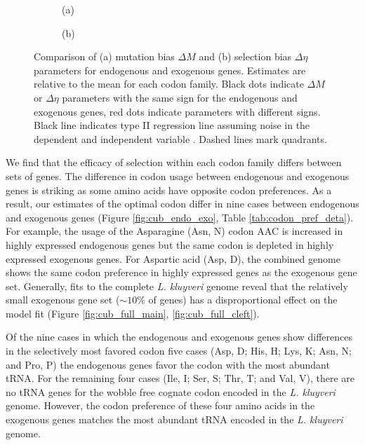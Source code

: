 \documentclass{bmcart}
\def\texttt{[image: ]}
\newcommand{\kluyveri}{\textit{L. kluyveri}\xspace}
\newcommand{\DM}{\ensuremath{{\Delta M}}\xspace}
\newcommand{\DE}{\ensuremath{{\Delta \eta}}\xspace}
\begin{document}
\begin{figure}
    \centering
    \begin{subfigure}
        \centering
        (a) %
    \end{subfigure}
    \begin{subfigure}
        \centering
        (b) %
    \end{subfigure}
    \caption{Comparison of (a) mutation bias \DM and (b) selection bias \DE parameters for endogenous and exogenous genes.
      Estimates are relative to the mean for each codon family.
      Black dots indicate \DM or \DE parameters with the same sign for the endogenous and exogenous genes, red dots indicate parameters with different signs.
      Black line indicates type II regression line assuming noise in the dependent and independent variable \citep{SokalAndRohlf1981}.
      Dashed lines mark quadrants.}
    \label{fig:csp_comp}
\end{figure}


We find that the efficacy of selection within each codon family differs between sets of genes.
The difference in codon usage between endogenous and exogenous genes is striking as some amino acids have opposite codon preferences. 
As a result, our estimates of the optimal codon differ in nine cases between endogenous and exogenous genes (Figure \ref{fig:cub_endo_exo}, Table \ref{tab:codon_pref_deta}).
For example, the usage of the Asparagine (Asn, N) codon AAC is increased in highly expressed endogenous genes but the same codon is depleted in highly expressed exogenous genes.
For Aspartic acid (Asp, D), the combined genome shows the same codon preference in highly expressed genes as the exogenous gene set.
Generally, fits to the complete \kluyveri genome reveal that the relatively small exogenous gene set ($\sim 10\%$ of genes) has a disproportional effect on the model fit (Figure \ref{fig:cub_full_main}, \ref{fig:cub_full_cleft}).

Of the nine cases in which the endogenous and exogenous genes show differences in the selectively most favored codon five cases (Asp, D; His, H; Lys, K; Asn, N; and Pro, P) the endogenous genes favor the codon with the most abundant tRNA.
For the remaining four cases (Ile, I; Ser, S; Thr, T; and Val, V), there are no tRNA genes for the wobble free cognate codon encoded in the \kluyveri genome.
However, the codon preference of these four amino acids in the exogenous genes matches the most abundant tRNA encoded in the \kluyveri genome.
\end{document}

